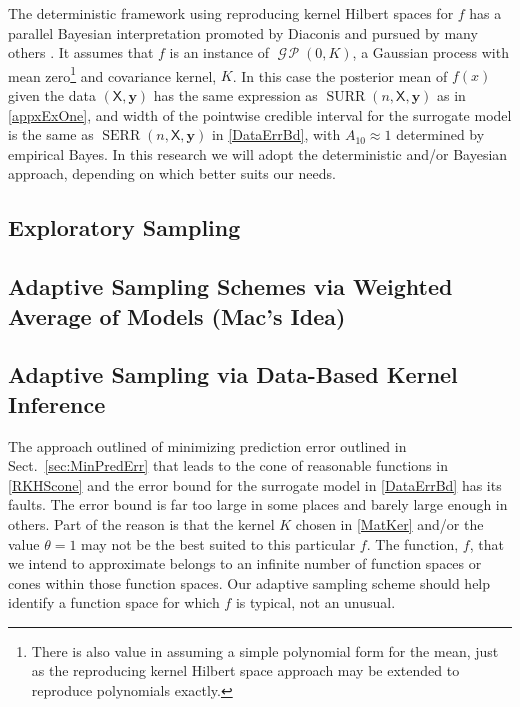 \documentclass[11pt]{NSFamsart}
\DeclareMathOperator{\GP}{\mathcal{G} \! \mathcal{P}}
\DeclareMathOperator{\SURR}{SURR}
\DeclareMathOperator{\SURRERR}{SERR}
\newcommand{\mX}{\mathsf{X}}
\newcommand{\by}{{\boldsymbol{y}}}
\begin{document}
The deterministic framework using reproducing kernel Hilbert spaces for $f$ has a parallel Bayesian interpretation promoted by Diaconis \cite{Dia88a} and pursued by many others \cite{BriEtal18a, OHa91a, OwhEtal19a, RasWil06a, Rit00a}.  It assumes that $f$ is an instance of $\GP(0,K)$, a Gaussian process with mean zero\footnote{There is also value in assuming a simple polynomial form for the mean, just as the reproducing kernel Hilbert space approach may be extended to reproduce polynomials exactly.} and covariance kernel, $K$.  In this case the posterior mean of $f(x)$ given the data $(\mX,\by)$ has the same expression as $\SURR(n,\mX,\by)$ as in \eqref{appxExOne}, and width of the pointwise credible interval for the surrogate model is the same as $\SURRERR(n,\mX,\by)$ in \eqref{DataErrBd}, with $A_{10} \approx 1$ determined by empirical Bayes.  In this research we will adopt the deterministic and/or Bayesian approach, depending on which better suits our needs.


\subsection{Exploratory Sampling} \label{sec:exploreSample}


\subsection{Adaptive Sampling Schemes via Weighted Average of Models (Mac's Idea)} \label{sec:Bootstrap}



\subsection{Adaptive Sampling via Data-Based Kernel Inference} \label{sec:kerinferdata}

The approach outlined of minimizing prediction error outlined in Sect.\  \ref{sec:MinPredErr} that leads to the  cone of reasonable functions in  \eqref{RKHScone} and the error bound for the surrogate model in \eqref{DataErrBd} has its faults. The error bound is far too large in some places and barely large enough in others.  Part of the reason is that the kernel $K$ chosen in \eqref{MatKer} and/or the value $\theta =1$ may not be the best suited to this particular $f$.  The function, $f$, that we intend to approximate belongs to an infinite number of function spaces or cones within those function spaces.  Our adaptive sampling scheme should help identify a function space for which $f$ is typical, not an unusual.
\end{document}

